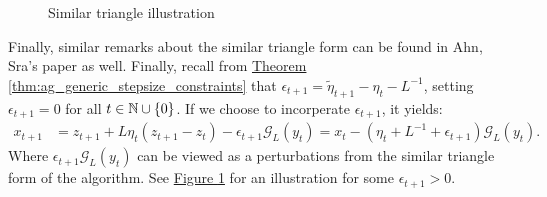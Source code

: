 \documentclass[12pt]{article}
\begin{document}
\begin{remark}
\begin{figure}[h]
{                    \label{fig:1b}
                }
                \caption{Similar triangle illustration}
            \end{figure}
            Finally, similar remarks about the similar triangle form can be found in Ahn, Sra's paper \cite{ahn_understanding_2022} as well. 
            Finally, recall from 
            \hyperref[thm:ag_generic_stepsize_constraints]
            {Theorem \ref*{thm:ag_generic_stepsize_constraints}}
            that $\epsilon_{t + 1} = \tilde \eta_{t + 1} - \eta_t - L^{-1}$, setting $\epsilon_{t + 1} =0$ for all $t \in \mathbb N \cup \{0\}$. 
            If we choose to incorperate $\epsilon_{t + 1}$, it yields: 
            \begin{align*}
                x_{t + 1} &= z_{t + 1} + L\eta_t(z_{t + 1} - z_t) - \epsilon_{t + 1}\mathcal G_L(y_t) = x_t - (\eta_t + L^{-1} + \epsilon_{t + 1})\mathcal G_L(y_t). 
            \end{align*}
            Where $\epsilon_{t + 1}\mathcal G_L(y_t)$ can be viewed as a perturbations from the similar triangle form of the algorithm. 
            See 
            \hyperref[fig:1b]{Figure \ref*{fig:1b}}
            for an illustration for some $\epsilon_{t + 1} > 0$. 
        \end{remark} 
        
        
\end{document}
